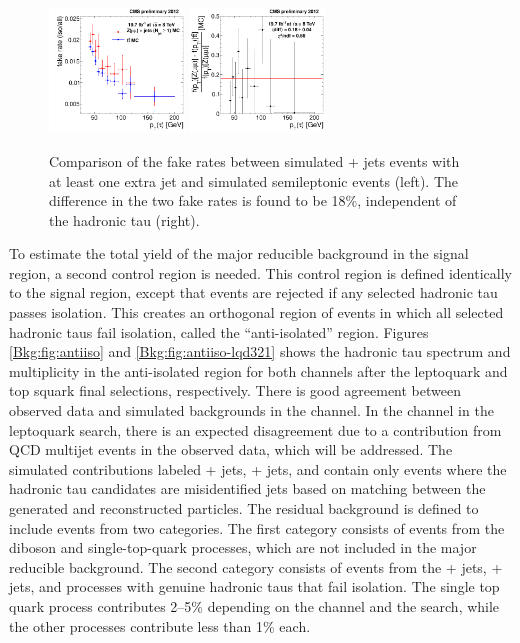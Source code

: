 \begin{figure}[hbt]
  \begin{center}
    \includegraphics[width=0.32\textwidth]{figures/bkgEstim/ttbar_fr_comp_final.pdf}
    \includegraphics[width=0.32\textwidth]{figures/bkgEstim/tfr_diff_ttbar_incl.pdf}
    \caption{Comparison of the fake rates between simulated \Zmm + jets events with at least one extra jet and simulated semileptonic \ttbar events (left). The difference in the two fake rates is found to be 18\%, independent of the hadronic tau \pt (right). \label{fig:fakeratettbardiff}}
  \end{center}
\end{figure}

To estimate the total yield of the major reducible background in the signal region, a second control region is needed. This control region is defined identically to the signal region, except that events are rejected if any selected hadronic tau passes isolation. This creates an orthogonal region of events in which all selected hadronic taus fail isolation, called the ``anti-isolated'' region. Figures \ref{Bkg:fig:antiiso} and \ref{Bkg:fig:antiiso-lqd321} shows the hadronic tau \pt spectrum and multiplicity in the anti-isolated region for both channels after the leptoquark and top squark final selections, respectively. There is good agreement between observed data and simulated backgrounds in the \mutau channel. In the \etau channel in the leptoquark search, there is an expected disagreement due to a contribution from QCD multijet events in the observed data, which will be addressed. The simulated contributions labeled \W + jets, \Z + jets, and \ttbar contain only events where the hadronic tau candidates are misidentified jets based on matching between the generated and reconstructed particles. The residual background is defined to include events from two categories. The first category consists of events from the diboson and single-top-quark processes, which are not included in the major reducible background. The second category consists of events from the \W + jets, \Z + jets, and \ttbar processes with genuine hadronic taus that fail isolation. The single top quark process contributes 2--5\% depending on the channel and the search, while the other processes contribute less than 1\% each.


